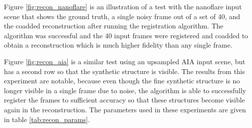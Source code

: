 \documentclass[tocnosub,noragright,centerchapter,12pt]{uiucecethesis09}
\begin{document}
Figure \ref{fig:recon_nanoflare} is an illustration of a test with the nanoflare input scene that shows the ground truth, a single noisy frame out of a set of 40, and the coadded reconstruction after running the registration algorithm.  The algorithm was successful and the 40 input frames were registered and coadded to obtain a reconstruction which is much higher fidelity than any single frame.

Figure \ref{fig:recon_aia} is a similar test using an upsampled AIA input scene, but has a second row so that the synthetic structure is visible.  The results from this experiment are notable, because even though the fine synthetic structure is no longer visible in a single frame due to noise, the algorithm is able to successfully register the frames to sufficient accuracy so that these structures become visible again in the reconstruction.  The parameters used in these experiments are given in table \ref{tab:recon_params}.
\end{document}
